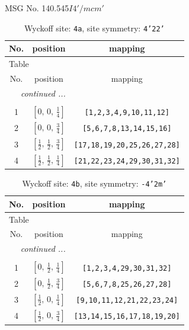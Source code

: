 \documentclass[fleqn,8pt]{jsarticle}
\begin{document}
\setcounter{MaxMatrixCols}{32}

\renewcommand{\tablename}{Table~}
\renewcommand{\figurename}{Figure~}
\begin{center}
\LARGE
MSG No. 140.545\quad$I4'/mcm'$
\end{center}
\renewcommand{\arraystretch}{1.2}
\begin{longtable}{ccc}
\caption{Wyckoff site: {\tt 4a}, site symmetry: {\tt 4'22'}}
 \\
 \hline \hline
No. & position & mapping \\ \hline \endfirsthead

\multicolumn{2}{l}{\tablename\ \thetable{}} \\
 \hline \hline
No. & position & mapping \\ \hline \endhead

 \hline \hline
\multicolumn{2}{r}{\footnotesize\it continued ...} \\ \endfoot

 \hline \hline
\multicolumn{2}{r}{} \\ \endlastfoot

1 & $\left[ 0,\, 0,\, \frac{1}{4} \right]$ & {\tt [1,2,3,4,9,10,11,12]} \\ \hline
2 & $\left[ 0,\, 0,\, \frac{3}{4} \right]$ & {\tt [5,6,7,8,13,14,15,16]} \\ \hline
3 & $\left[ \frac{1}{2},\, \frac{1}{2},\, \frac{3}{4} \right]$ & {\tt [17,18,19,20,25,26,27,28]} \\ \hline
4 & $\left[ \frac{1}{2},\, \frac{1}{2},\, \frac{1}{4} \right]$ & {\tt [21,22,23,24,29,30,31,32]} \\
\end{longtable}
\renewcommand{\arraystretch}{1.2}
\begin{longtable}{ccc}
\caption{Wyckoff site: {\tt 4b}, site symmetry: {\tt -4'2m'}}
 \\
 \hline \hline
No. & position & mapping \\ \hline \endfirsthead

\multicolumn{2}{l}{\tablename\ \thetable{}} \\
 \hline \hline
No. & position & mapping \\ \hline \endhead

 \hline \hline
\multicolumn{2}{r}{\footnotesize\it continued ...} \\ \endfoot

 \hline \hline
\multicolumn{2}{r}{} \\ \endlastfoot

1 & $\left[ 0,\, \frac{1}{2},\, \frac{1}{4} \right]$ & {\tt [1,2,3,4,29,30,31,32]} \\ \hline
2 & $\left[ 0,\, \frac{1}{2},\, \frac{3}{4} \right]$ & {\tt [5,6,7,8,25,26,27,28]} \\ \hline
3 & $\left[ \frac{1}{2},\, 0,\, \frac{1}{4} \right]$ & {\tt [9,10,11,12,21,22,23,24]} \\ \hline
4 & $\left[ \frac{1}{2},\, 0,\, \frac{3}{4} \right]$ & {\tt [13,14,15,16,17,18,19,20]} \\
\end{longtable}
\end{document}
